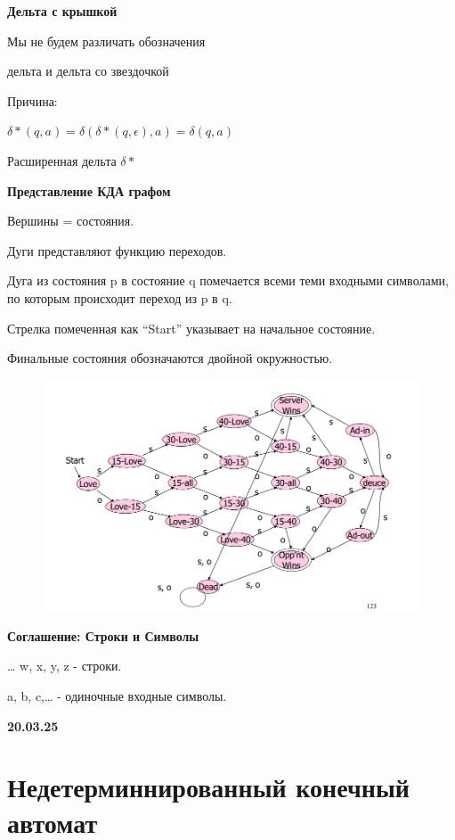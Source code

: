 \documentclass{article}
\begin{document}
\textbf{Дельта с крышкой}

Мы не будем различать обозначения

дельта и дельта со звездочкой

Причина:

$\delta*(q, a) = \delta(\delta*(q, \epsilon), a) = \delta(q, a)$

Расширенная дельта $\delta*$


\textbf{Представление КДА графом}

Вершины = состояния.

Дуги представляют функцию переходов.

Дуга из состояния p в состояние q помечается всеми
теми входными символами, по которым происходит
переход из p в q.

Стрелка помеченная как “Start” указывает на
начальное состояние.

Финальные состояния обозначаются двойной
окружностью.

\begin{figure}[H]
    \centering
    \includegraphics[width=1\linewidth]{Снимок экрана 2025-03-06 094224.png}
\end{figure}



\textbf{Соглашение: Строки и Символы}

… w, x, y, z - строки.

a, b, c,… - одиночные входные
символы.


\textbf{20.03.25}

\section{Недетерминнированный конечный автомат}
\end{document}
